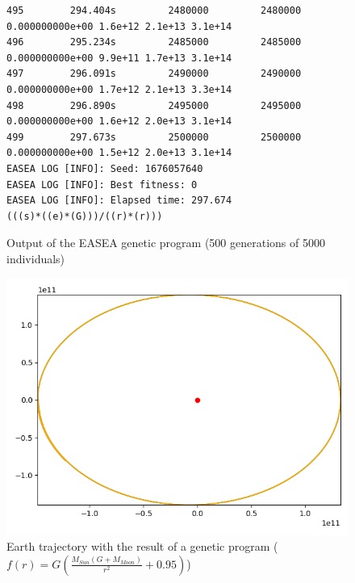 \begin{figure}
    \begin{lstlisting}
495        294.404s         2480000         2480000 0.000000000e+00 1.6e+12 2.1e+13 3.1e+14
496        295.234s         2485000         2485000 0.000000000e+00 9.9e+11 1.7e+13 3.1e+14
497        296.091s         2490000         2490000 0.000000000e+00 1.7e+12 2.1e+13 3.3e+14
498        296.890s         2495000         2495000 0.000000000e+00 1.6e+12 2.0e+13 3.1e+14
499        297.673s         2500000         2500000 0.000000000e+00 1.5e+12 2.0e+13 3.1e+14
EASEA LOG [INFO]: Seed: 1676057640
EASEA LOG [INFO]: Best fitness: 0
EASEA LOG [INFO]: Elapsed time: 297.674
(((s)*((e)*(G)))/((r)*(r)))
\end{lstlisting}
    \caption{Output of the EASEA genetic program (500 generations of 5000
        individuals)}
    \label{gp_1}
\end{figure}

\begin{figure}
    \center
    \includegraphics[scale=.3]{img/newton_gp_1.png}
    \caption{Earth trajectory with the result of a genetic program (\(f(r) = G
        \left( \frac{M_{Sun}(G + M_{Moon})}{r^2} + 0.95 \right)\))}
    \label{gp_2}
\end{figure}

